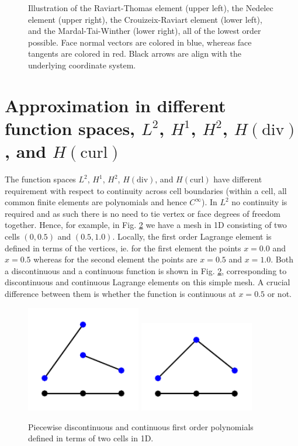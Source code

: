 \begin{figure}
\begin{center}
	\caption{Illustration of the Raviart-Thomas element (upper left), the  Nedelec element (upper right), the Crouizeix-Raviart element (lower left), and the Mardal-Tai-Winther (lower right), all of the lowest order possible. 
Face normal vectors are colored in blue, whereas face tangents are colored in red. Black arrows are  
align with the underlying coordinate system. 
} \label{fig:rtetc}
\end{center}

\end{figure}

\section{Approximation in different function spaces, $L^2$, $H^1$, $H^2$, $H(\mbox{div})$, and $H(\mbox{curl})$ }

The function spaces 
$L^2$, $H^1$, $H^2$, $H(\mbox{div})$, and $H(\mbox{curl})$ 
have different requirement with respect to continuity across cell boundaries (within a cell, all common finite elements are 
polynomials and hence $C^\infty$). In $L^2$ no continuity is required and as such there is no need to tie vertex or face
degrees of freedom together. Hence, for example, in Fig. \ref{fig:dgcg} we have a mesh in 1D consisting of two cells $(0, 0.5)$ and
$(0.5, 1.0)$. Locally, the first order Lagrange element is defined in terms of the vertices, ie. for the first element the points
$x=0.0$ and $x=0.5$ whereas for the second element the points are $x=0.5$ and $x=1.0$. Both a discontinuous and a continuous
function is shown in Fig. \ref{fig:dgcg}, corresponding to discontinuous and continuous Lagrange elements on this simple mesh. 
A crucial difference between them is whether the function is continuous at $x=0.5$ or not. 


\begin{figure}
\begin{center}
\includegraphics[width=5cm]{chapters/element/dg.pdf}
\includegraphics[width=5cm]{chapters/element/cg.pdf}
\caption{Piecewise discontinuous and continuous first order polynomials defined in terms of two cells in 1D. }  
\label{fig:dgcg}
\end{center}
\end{figure}



